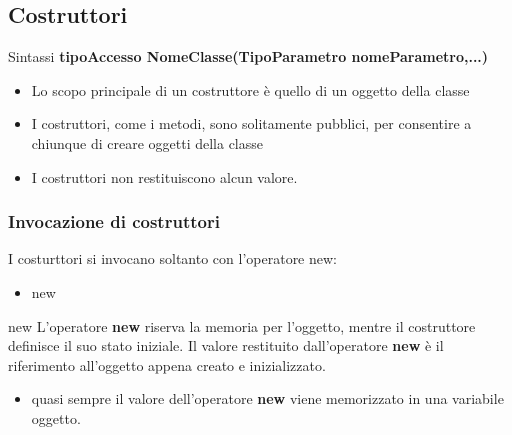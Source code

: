 \subsection*{Costruttori}
\begin{frame}
\begin{block}{Sintassi}
\textbf{tipoAccesso \alert{NomeClasse}(TipoParametro nomeParametro,...)}
\end{block}
\begin{itemize}
\item Lo scopo principale di un costruttore è quello di  un oggetto della classe
\item I costruttori, come i metodi, sono solitamente pubblici, per consentire a chiunque di creare oggetti della classe
\item I costruttori \alert{non} restituiscono alcun valore.
\end{itemize}
\end{frame}
%
\begin{frame}
\frametitle{Invocazione di costruttori}
\begin{block}{}
I costurttori si invocano soltanto con l'operatore new:
\begin{itemize}
\item \alert{new} 
\end{itemize}
\end{block}
\begin{block}{new}
L'operatore \textbf{new} riserva la memoria per l'oggetto, mentre il costruttore definisce il suo stato iniziale.
Il valore restituito dall'operatore \textbf{new} è il riferimento all'oggetto appena creato e inizializzato.
\begin{itemize}
\item quasi sempre il valore dell'operatore \textbf{new} viene memorizzato in una variabile oggetto.
\end{itemize}
\end{block}
\end{frame}

